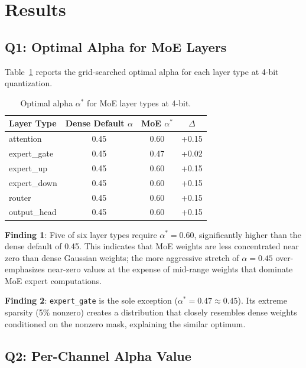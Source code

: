 \section{Results}

\subsection{Q1: Optimal Alpha for MoE Layers}

Table~\ref{tab:alpha_moe} reports the grid-searched optimal alpha for each layer type
at 4-bit quantization.

\begin{table}[h]
\centering
\caption{Optimal alpha $\alpha^*$ for MoE layer types at 4-bit.}
\label{tab:alpha_moe}
\begin{tabular}{lccc}
\toprule
\textbf{Layer Type} & \textbf{Dense Default $\alpha$} & \textbf{MoE $\alpha^*$} & \textbf{$\Delta$} \\
\midrule
attention          & 0.45 & 0.60 & +0.15 \\
expert\_gate       & 0.45 & 0.47 & +0.02 \\
expert\_up         & 0.45 & 0.60 & +0.15 \\
expert\_down       & 0.45 & 0.60 & +0.15 \\
router             & 0.45 & 0.60 & +0.15 \\
output\_head       & 0.45 & 0.60 & +0.15 \\
\bottomrule
\end{tabular}
\end{table}

\textbf{Finding 1}: Five of six layer types require $\alpha^* = 0.60$, significantly
higher than the dense default of 0.45. This indicates that MoE weights are
less concentrated near zero than dense Gaussian weights; the more aggressive
stretch of $\alpha = 0.45$ over-emphasizes near-zero values at the expense of
mid-range weights that dominate MoE expert computations.

\textbf{Finding 2}: \texttt{expert\_gate} is the sole exception ($\alpha^* = 0.47 \approx 0.45$).
Its extreme sparsity (5\% nonzero) creates a distribution that closely resembles
dense weights conditioned on the nonzero mask, explaining the similar optimum.

\subsection{Q2: Per-Channel Alpha Value}

